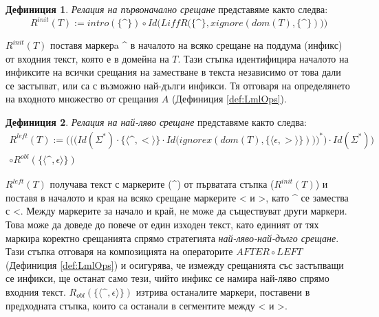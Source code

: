 \documentclass[12pt, oneside]{article}
\theoremstyle{definition}
\newtheorem{definition}{Дефиниция}[section]
\begin{document}
\begin{definition}\label{def:Rinit} \emph{Релация на първоначално срещане} представяме както следва:
	\[ R^{init}(T) := intro(\{ \text{\textasciicircum} \}) \circ Id \Big(LiffR \big(\{ \text{\textasciicircum} \}, xignore(dom(T), \{ \text{\textasciicircum} \}) \big) \Big) \]

	\( R^{init}(T) \) поставя маркерa \textasciicircum \hspace*{0cm} в началото на всяко срещане на поддума (инфикс) от входния текст, която е в домейна на \(T\). Тази стъпка идентифицира началото на инфиксите на всички срещания на заместване в текста независимо от това дали се застъпват, или са с възможно най-дълги инфикси. Тя отговаря на определянето на входното множество от срещания \(A\) (Дефиниция \ref{def:LmlOps}).
\end{definition}

\begin{definition}\label{def:Rleft} \emph{Релация на най-ляво срещане} представяме както следва:
	\begin{equation}
		\begin{split}
			R^{left}(T) :=
			\bigg( \bigg( \Big( Id(\Sigma^*) \cdot \{ \langle \text{\textasciicircum}, < \rangle \} \cdot Id \big(ignorex(dom(T), \{ \langle \epsilon, > \rangle \})\big) \Big)^* \bigg) \cdot Id(\Sigma^*) \bigg) \\ 
			\circ R^{obl} (\{ \langle \text{\textasciicircum}, \epsilon \rangle \}) 
		\end{split}
	\end{equation}

	\(R^{left}(T)\) получава текст с маркерите (\textasciicircum) от първатата стъпка (\(R^{init}(T)\)) и поставя в началото и края на всяко срещане маркерите < и >, като  \textasciicircum \hspace*{0cm} се замества с <. Между маркерите за начало и край, не може да съществуват други маркери. Това може да доведе до повече от един изходен текст, като единият от тях маркира коректно срещанията спрямо стратегията \emph{най-ляво-най-дълго срещане}. Тази стъпка отговаря на композицията на операторите \(AFTER \circ LEFT\) (Дефиниция \ref{def:LmlOps}) и осигурява, че измежду срещанията със застъпващи се инфикси, ще останат само тези, чийто инфикс се намира най-ляво спрямо входния текст. \( R_{obl} (\{ \langle \text{\textasciicircum}, \epsilon \rangle \}) \) изтрива останалите маркери, поставени в предходната стъпка, които са останали в сегментите между < и >.
\end{definition}
\end{document}
